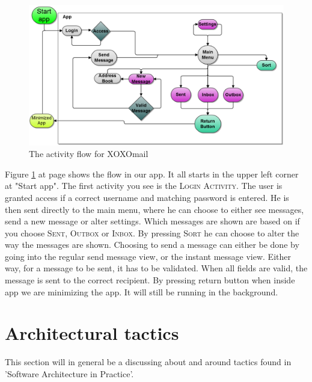 \begin{figure}
	\includegraphics[width=\textwidth]{Android_GUI_flow_chart_2}
	\caption{The activity flow for XOXOmail}
	\label{fig:logicalGUIview}
\end{figure}

Figure \ref{fig:logicalGUIview} at page \pageref{fig:logicalGUIview} shows the flow in our app. It all starts in the upper left corner at "Start app". The first activity you see is the \textsc{Login Activity}. The user is granted access if a correct username and matching password is entered. He is then sent directly to the main menu, where he can choose to either see messages, send a new message or alter settings. Which messages are shown are based on if you choose \textsc{Sent}, \textsc{Outbox} or \textsc{Inbox}. By pressing \textsc{Sort} he can choose to alter the way the messages are shown. Choosing to send a message can either be done by going into the regular send message view, or the instant message view. Either way, for a message to be sent, it has to be validated. When all fields are valid, the message is sent to the correct recipient. By pressing return button when inside app we are minimizing the app. It will still be running in the background.





\section{Architectural tactics}
	This section will in general be a discussing about and around tactics found in 'Software Architecture in Practice'\cite{bib:archi}. 
